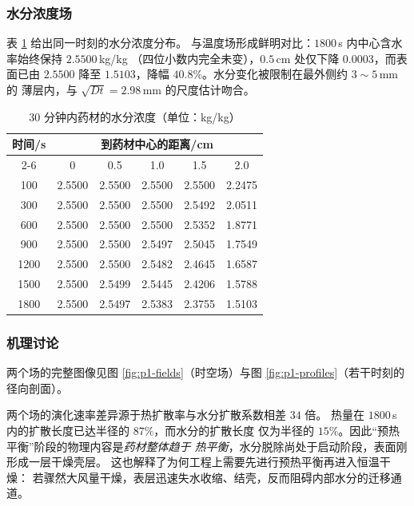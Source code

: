 \documentclass[12pt,a4paper,fontset=none]{ctexart}
\begin{document}
\subsubsection{水分浓度场}

表 \ref{tab:p1-C} 给出同一时刻的水分浓度分布。
与温度场形成鲜明对比：$1800$\,s 内中心含水率始终保持 $2.5500$\,kg/kg
（四位小数内完全未变），$0.5$\,cm 处仅下降 $0.0003$，而表面已由 $2.5500$
降至 $1.5103$，降幅 $40.8\%$。水分变化被限制在最外侧约 $3\sim5$\,mm 的
薄层内，与 $\sqrt{Dt}=2.98$\,mm 的尺度估计吻合。

\begin{table}[htbp]
  \centering
  \caption{30 分钟内药材的水分浓度（单位：kg/kg）}
  \label{tab:p1-C}
  \begin{tabular}{cccccc}
    \toprule
    \multirow{2}{*}{时间/s} & \multicolumn{5}{c}{到药材中心的距离/cm} \\
    \cmidrule(lr){2-6}
     & 0     & 0.5   & 1.0   & 1.5   & 2.0 \\
    \midrule
    100  & 2.5500 & 2.5500 & 2.5500 & 2.5500 & 2.2475 \\
    300  & 2.5500 & 2.5500 & 2.5500 & 2.5492 & 2.0511 \\
    600  & 2.5500 & 2.5500 & 2.5500 & 2.5352 & 1.8771 \\
    900  & 2.5500 & 2.5500 & 2.5497 & 2.5045 & 1.7549 \\
    1200 & 2.5500 & 2.5500 & 2.5482 & 2.4645 & 1.6587 \\
    1500 & 2.5500 & 2.5499 & 2.5445 & 2.4206 & 1.5788 \\
    1800 & 2.5500 & 2.5497 & 2.5383 & 2.3755 & 1.5103 \\
    \bottomrule
  \end{tabular}
\end{table}

\subsubsection{机理讨论}

两个场的完整图像见图 \ref{fig:p1-fields}（时空场）与图
\ref{fig:p1-profiles}（若干时刻的径向剖面）。

两个场的演化速率差异源于热扩散率与水分扩散系数相差 $34$ 倍。
热量在 $1800$\,s 内的扩散长度已达半径的 $87\%$，而水分的扩散长度
仅为半径的 $15\%$。因此``预热平衡''阶段的物理内容是\emph{药材整体趋于
热平衡}，水分脱除尚处于启动阶段，表面刚形成一层干燥壳层。
这也解释了为何工程上需要先进行预热平衡再进入恒温干燥：
若骤然大风量干燥，表层迅速失水收缩、结壳，反而阻碍内部水分的迁移通道。
\end{document}
